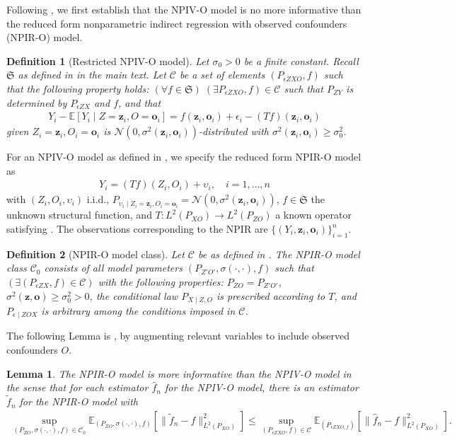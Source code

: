 \documentclass[11pt]{article}
\newcommand{\bz}{\mathbf z}
\newcommand{\bo}{\mathbf o}
\newcommand{\calC}{\mathcal{C}}
\newcommand{\calN}{\mathcal{N}}
\newcommand{\0}{\mathbf{0}}
\newtheorem{lem}{Lemma}[section]
\newtheorem{defi}{Definition}
\begin{document}
\begin{appendix}
Following \citet[Section 3]{chen2011rate}, we first establish that the NPIV-O model is no more informative than the reduced form nonparametric indirect regression with observed confounders (NPIR-O) model. 
\begin{defi}[Restricted NPIV-O model]
\label{def:appendix_restricted_npivo}
    Let $\sigma_0>0$ be a finite constant. Recall $\mathfrak{S}$ as defined in  in the main text. Let $\calC$ be a set of elements $(P_{\epsilon ZXO}, f)$ such that the following property holds: $(\forall f\in \mathfrak{S})\;(\exists P_{\epsilon ZXO}, f)\in \calC$ such that $P_{ZY}$ is determined by $P_{\epsilon ZX}$ and $f$, and that
    \begin{align*}
        Y_i - \mathbb{E}[Y_i\mid Z = \bz_i, O = \bo_i] = f(\bz_i,\bo_i) + \epsilon_i - (Tf)(\bz_i,\bo_i)
    \end{align*}
    given $Z_i = \bz_i, O_i = \bo_i$ is $\calN(0, \sigma^2(\bz_i,\bo_i))$-distributed with $\sigma^2(\bz_i,\bo_i) \geq \sigma_0^2$. 
\end{defi}
For an NPIV-O model as defined in , we specify the reduced form NPIR-O model as
\begin{align*}
    Y_i = (Tf)(Z_i, O_i) + \upsilon_i, \quad i = 1,\dots, n
\end{align*}
with $(Z_i, O_i, \upsilon_i)$ i.i.d., $P_{\upsilon_i\mid Z_i = \bz_i,O_i = \bo_i} = \calN(0,\sigma^2(\bz_i, \bo_i))$, $f\in \mathfrak{S}$ the unknown structural function, and $T: L^2(P_{XO})\to L^2(P_{ZO})$ a known operator satisfying . The observations corresponding to the NPIR are $\{(Y_i, \bz_i, \bo_i)\}_{i=1}^{n}$. 
\begin{defi}[NPIR-O model class]
\label{def:npiro_model_class}
    Let $\calC$ be as defined in . The NPIR-O model class $\calC_0$ consists of all model parameters $(P_{Z'O'}, \sigma(\cdot, \cdot), f)$ such that $(\exists (P_{\epsilon ZX}, f)\in \calC)$ with the following properties: $P_{ZO} = P_{Z'O'}$, $\sigma^2(\bz,\bo)\geq \sigma_0^2 > 0$, the conditional law $P_{X\mid Z,O}$ is prescribed according to $T$, and $P_{\epsilon\mid ZOX}$ is arbitrary among the conditions imposed in $\calC$. 
\end{defi}
The following Lemma is \citet[Lemma 1]{chen2007large}, by augmenting relevant variables to include observed confounders $O$. 
\begin{lem}
\label{lem:npir_o_more_informative}
    The NPIR-O model is more informative than the NPIV-O model in the sense that for each estimator $\hat{f}_n$ for the NPIV-O model, there is an estimator $\tilde{f}_n$ for the NPIR-O model with 
    \begin{align*}
        \sup_{(P_{ZO}, \sigma(\cdot, \cdot), f)\in \calC_0}\mathbb{E}_{(P_{ZO},\sigma(\cdot, \cdot), f)}[\|\tilde{f}_n - f\|^2_{L^2(P_{XO})}] \leq \sup_{(P_{\epsilon ZXO}, f)\in \calC}\mathbb{E}_{(P_{\epsilon ZXO, f})}[\|\hat{f}_n - f\|^2_{L^2(P_{XO})}].
    \end{align*}
\end{lem}



\end{appendix}
\end{document}
